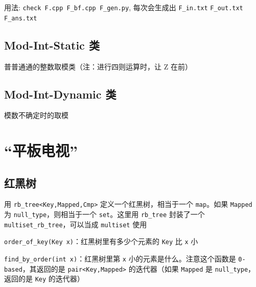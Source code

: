 \documentclass[12pt]{article}
\theoremstyle{definition}
\theoremstyle{remark}
\begin{document}


用法: \texttt{check F.cpp F\_bf.cpp F\_gen.py}, 每次会生成出 \texttt{F\_in.txt} \texttt{F\_out.txt} \texttt{F\_ans.txt}

\newpage

\subsection{Mod-Int-Static 类}

普普通通的整数取模类（注：进行四则运算时，让 Z 在前）



\newpage

\subsection{Mod-Int-Dynamic 类}

模数不确定时的取模



\newpage

% 
% 

\newpage

{\centering\section{“平板电视”}}

\subsection{红黑树}

用 \texttt{rb\_{}tree<Key,Mapped,Cmp>} 定义一个红黑树，相当于一个 \texttt{map}。如果 \texttt{Mapped} 为 \texttt{null\_{}type}，则相当于一个 \texttt{set}。这里用 \texttt{rb\_{}tree} 封装了一个 \texttt{multiset\_{}rb\_{}tree}，可以当成 \texttt{multiset} 使用

\texttt{order\_{}of\_{}key(Key x)}：红黑树里有多少个元素的 \texttt{Key} 比 \texttt{x} 小

\texttt{find\_{}by\_{}order(int x)}：红黑树里第 \texttt{x} 小的元素是什么。注意这个函数是 \texttt{0-based}，其返回的是 \texttt{pair<Key,Mapped>} 的迭代器（如果 \texttt{Mapped} 是 \texttt{null\_{}type}，返回的是 \texttt{Key} 的迭代器）
\end{document}
